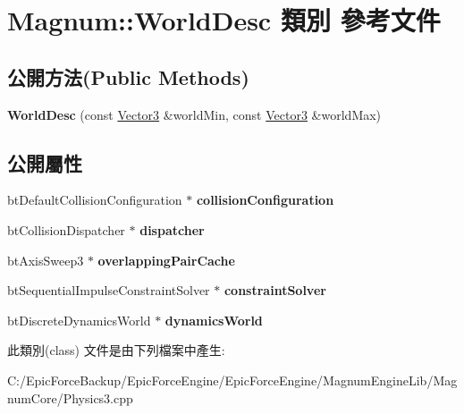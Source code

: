 \hypertarget{class_magnum_1_1_world_desc}{}\section{Magnum\+:\+:World\+Desc 類別 參考文件}
\label{class_magnum_1_1_world_desc}
\subsection*{公開方法(Public Methods)}
\begin{DoxyCompactItemize}
\item 
{\bfseries World\+Desc} (const \hyperlink{class_magnum_1_1_vector3}{Vector3} \&world\+Min, const \hyperlink{class_magnum_1_1_vector3}{Vector3} \&world\+Max)\hypertarget{class_magnum_1_1_world_desc_afad81862e2de7d382039d3bf0df38080}{}\label{class_magnum_1_1_world_desc_afad81862e2de7d382039d3bf0df38080}

\end{DoxyCompactItemize}
\subsection*{公開屬性}
\begin{DoxyCompactItemize}
\item 
bt\+Default\+Collision\+Configuration $\ast$ {\bfseries collision\+Configuration}\hypertarget{class_magnum_1_1_world_desc_a226437587d8cbd49ddbb6eef1eeb1f45}{}\label{class_magnum_1_1_world_desc_a226437587d8cbd49ddbb6eef1eeb1f45}

\item 
bt\+Collision\+Dispatcher $\ast$ {\bfseries dispatcher}\hypertarget{class_magnum_1_1_world_desc_a8e24627169743f222d2ca9e0a90b475e}{}\label{class_magnum_1_1_world_desc_a8e24627169743f222d2ca9e0a90b475e}

\item 
bt\+Axis\+Sweep3 $\ast$ {\bfseries overlapping\+Pair\+Cache}\hypertarget{class_magnum_1_1_world_desc_a6ec5e65e7bda7d4dae58a84430011a78}{}\label{class_magnum_1_1_world_desc_a6ec5e65e7bda7d4dae58a84430011a78}

\item 
bt\+Sequential\+Impulse\+Constraint\+Solver $\ast$ {\bfseries constraint\+Solver}\hypertarget{class_magnum_1_1_world_desc_a33d518ee6fd4a987279db253dd557758}{}\label{class_magnum_1_1_world_desc_a33d518ee6fd4a987279db253dd557758}

\item 
bt\+Discrete\+Dynamics\+World $\ast$ {\bfseries dynamics\+World}\hypertarget{class_magnum_1_1_world_desc_a7bd85786556232ea00159079fb9b5e6f}{}\label{class_magnum_1_1_world_desc_a7bd85786556232ea00159079fb9b5e6f}

\end{DoxyCompactItemize}


此類別(class) 文件是由下列檔案中產生\+:\begin{DoxyCompactItemize}
\item 
C\+:/\+Epic\+Force\+Backup/\+Epic\+Force\+Engine/\+Epic\+Force\+Engine/\+Magnum\+Engine\+Lib/\+Magnum\+Core/Physics3.\+cpp\end{DoxyCompactItemize}
